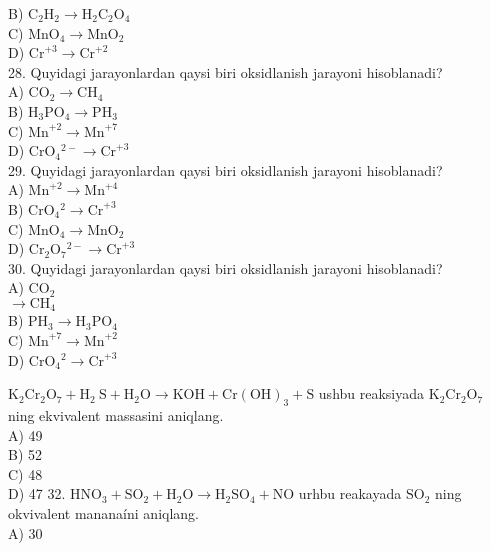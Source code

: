 B) $\mathrm{C}_{2} \mathrm{H}_{2} \rightarrow \mathrm{H}_{2} \mathrm{C}_{2} \mathrm{O}_{4}$\\
C) $\mathrm{MnO}_{4} \rightarrow \mathrm{MnO}_{2}$\\
D) $\mathrm{Cr}^{+3} \rightarrow \mathrm{Cr}^{+2}$\\
28. Quyidagi jarayonlardan qaysi biri oksidlanish jarayoni hisoblanadi?\\
A) $\mathrm{CO}_{2} \rightarrow \mathrm{CH}_{4}$\\
B) $\mathrm{H}_{3} \mathrm{PO}_{4} \rightarrow \mathrm{PH}_{3}$\\
C) $\mathrm{Mn}^{+2} \rightarrow \mathrm{Mn}^{+7}$\\
D) $\mathrm{CrO}_{4}{ }^{2-} \rightarrow \mathrm{Cr}^{+3}$\\
29. Quyidagi jarayonlardan qaysi biri oksidlanish jarayoni hisoblanadi?\\
A) $\mathrm{Mn}^{+2} \rightarrow \mathrm{Mn}^{+4}$\\
B) $\mathrm{CrO}_{4}{ }^{2} \rightarrow \mathrm{Cr}^{+3}$\\
C) $\mathrm{MnO}_{4} \rightarrow \mathrm{MnO}_{2}$\\
D) $\mathrm{Cr}_{2} \mathrm{O}_{7}{ }^{2-} \rightarrow \mathrm{Cr}^{+3}$\\
30. Quyidagi jarayonlardan qaysi biri oksidlanish jarayoni hisoblanadi?\\
A) $\mathrm{CO}_{2}$\\$\rightarrow \mathrm{CH}_{4}$\\
B) $\mathrm{PH}_{3} \rightarrow \mathrm{H}_{3} \mathrm{PO}_{4}$\\
C) $\mathrm{Mn}^{+7} \rightarrow \mathrm{Mn}^{+2}$\\
D) $\mathrm{CrO}_{4}{ }^{2} \rightarrow \mathrm{Cr}^{+3}$
  \item $\mathrm{K}_{2} \mathrm{Cr}_{2} \mathrm{O}_{7}+\mathrm{H}_{2} \mathrm{~S}+\mathrm{H}_{2} \mathrm{O} \rightarrow \mathrm{KOH}+\mathrm{Cr}(\mathrm{OH})_{3}+\mathrm{S}$ ushbu reaksiyada $\mathrm{K}_{2} \mathrm{Cr}_{2} \mathrm{O}_{7}$ ning ekvivalent massasini aniqlang.\\
A) 49\\
B) 52\\
C) 48\\
D) 47
32. $\mathrm{HNO}_{3}+\mathrm{SO}_{2}+\mathrm{H}_{2} \mathrm{O} \rightarrow \mathrm{H}_{2} \mathrm{SO}_{4}+\mathrm{NO}$ urhbu reakayada $\mathrm{SO}_{2}$ ning okvivalent mananaíni aniqlang.\\
A) 30\\
